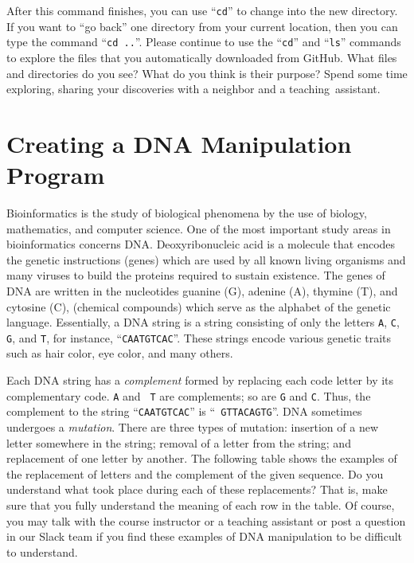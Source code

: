 \documentclass[11pt]{article}
\newcommand{\command}[1]{``\lstinline{#1}''}
\newcommand{\step}[1]{``{#1}''}
\begin{document}
After this command finishes, you can use \command{cd} to change into the new directory. If you want to \step{go back}
one directory from your current location, then you can type the command \command{cd ..}. Please continue to use the
\command{cd} and \command{ls} commands to explore the files that you automatically downloaded from GitHub. What files
and directories do you see? What do you think is their purpose? Spend some time exploring, sharing your discoveries with
a neighbor and a \mbox{teaching assistant}.

\section*{Creating a DNA Manipulation Program}

Bioinformatics is the study of biological phenomena by the use of biology, mathematics, and computer science. One of the
most important study areas in bioinformatics concerns DNA. Deoxyribonucleic acid is a molecule that encodes the
genetic instructions (genes) which are used by all known living organisms and many viruses to build the proteins
required to sustain existence. The genes of DNA are written in the nucleotides guanine (G), adenine (A), thymine (T),
and cytosine (C), (chemical compounds) which serve as the alphabet of the genetic language.  Essentially, a DNA string
is a string consisting of only the letters {\tt A}, {\tt C}, {\tt G}, and {\tt T}, for instance, ``{\tt CAATGTCAC}''.
These strings encode various genetic traits such as hair color, eye color, and many others.

Each DNA string has a {\em complement} formed by replacing each code letter by its complementary code. {\tt A} and {\tt
T} are complements; so are {\tt G} and {\tt C}. Thus, the complement to the string ``{\tt CAATGTCAC}'' is ``{\tt
GTTACAGTG}''.  DNA sometimes undergoes a {\em mutation}. There are three types of mutation: insertion of a new letter
somewhere in the string; removal of a letter from the string; and replacement of one letter by another. The following
table shows the examples of the replacement of letters and the complement of the given sequence. Do you understand what
took place during each of these replacements? That is, make sure that you fully understand the meaning of each row in
the table. Of course, you may talk with the course instructor or a teaching assistant or post a question in our Slack
team if you find these examples of DNA manipulation to be difficult to understand.
\end{document}
